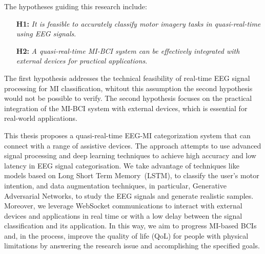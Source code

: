 The hypotheses guiding this research include:
\begin{itemize}
    \item[\textbf{H1:}] \emph{It is feasible to accurately classify motor imagery tasks in quasi-real-time using EEG signals}.
    \item[\textbf{H2:}] \emph{A quasi-real-time MI-BCI system can be effectively integrated with external devices for practical applications}.
\end{itemize}

The first hypothesis addresses the technical feasibility of real-time EEG signal processing for MI classification, whitout this assumption the second hypothesis would not be possible to verify.
The second hypothesis focuses on the practical integration of the MI-BCI system with external devices, which is essential for real-world applications.

This thesis proposes a quasi-real-time EEG-MI categorization system that can connect with a range of assistive devices.
The approach attempts to use advanced signal processing and deep learning techniques to achieve high accuracy and low latency in EEG signal categorisation. 
We take advantage of techniques like models based on Long Short Term Memory~(LSTM), to classify the user's motor intention, and data augmentation techniques, in particular, Generative Adversarial Networks, to study the EEG signals and generate realistic samples.
Moreover, we leverage WebSocket communications to interact with external devices and applications in real time or with a low delay between the signal classification and its application.
In this way, we aim to progress MI-based BCIs and, in the process, improve the quality of life (QoL) for people with physical limitations by answering the research issue and accomplishing the specified goals.



